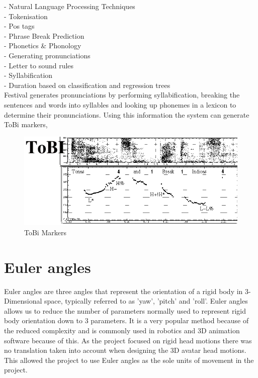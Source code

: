 \documentclass[bsc,frontabs,twoside,singlespacing,parskip]{infthesis}
\begin{document}
- Natural Language Processing Techniques \\
- Tokenisation \\
- Pos tags \\
- Phrase Break Prediction \\
- Phonetics \& Phonology \\
- Generating pronunciations \\
- Letter to sound rules\\
- Syllabification\\
- Duration based on classification and regression trees \\
Festival generates pronunciations by performing syllabification, breaking the sentences and words into syllables and looking up phonemes in a lexicon to determine their pronunciations. Using this information the system can generate ToBi markers, 

\begin{figure}[h!]
	\centering
	\includegraphics[width=1\textwidth]{tobi.png}
	\caption{ToBi Markers}
\end{figure}

\section{Euler angles}

Euler angles are three angles that represent the orientation of a rigid body in 3-Dimensional space, typically referred to as 'yaw', 'pitch' and 'roll'. Euler angles allows us to reduce the number of parameters normally used to represent rigid body orientation down to 3 parameters. It is a very popular method because of the reduced complexity and is commonly used in robotics and 3D animation software because of this. As the project focused on rigid head motions there was no translation taken into account when designing the 3D avatar head motions. This allowed the project to use Euler angles as the sole units of movement in the project.
\end{document}
